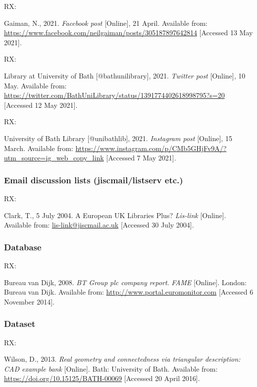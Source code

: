 RX: \cite{gaiman2021fbp}

Gaiman, N., 2021. \emph{Facebook post} [Online], 21 April. Available from: \url{https://www.facebook.com/neilgaiman/posts/305187897642814} [Accessed 13 May 2021].


RX: \cite{ublib2021tp}

Library at University of Bath [@bathunilibrary], 2021. \emph{Twitter post} [Online], 10 May. Available from: \url{https://twitter.com/BathUniLibrary/status/1391774402618998795?s=20} [Accessed 12 May 2021].


RX: \cite{ublib2021ip}

University of Bath Library [@unibathlib], 2021. \emph{Instagram post} [Online], 15 March. Available from: \url{https://www.instagram.com/p/CMb5GHjFv9A/?utm_source=ig_web_copy_link} [Accessed 7 May 2021].



\subsubsection*{Email discussion lists (jiscmail\slash listserv etc.)}

RX: \cite{clark2004euk}

Clark, T., 5 July 2004. A European UK Libraries Plus? \emph{Lis-link} [Online]. Available from: \url{lis-link@jiscmail.ac.uk} [Accessed 30 July 2004].



\subsubsection*{Database}

RX: \cite{bvd2008bt}

Bureau van Dijk, 2008. \emph{BT Group plc company report}. \emph{FAME} [Online]. London: Bureau van Dijk. Available from: \url{http://www.portal.euromonitor.com} [Accessed 6 November 2014].



\subsubsection*{Dataset}

RX: \cite{wilson2013rgc}

Wilson, D., 2013. \emph{Real geometry and connectedness via triangular description: CAD example bank} [Online]. Bath: University of Bath. Available from: \url{https://doi.org/10.15125/BATH-00069} [Accessed 20 April 2016].



